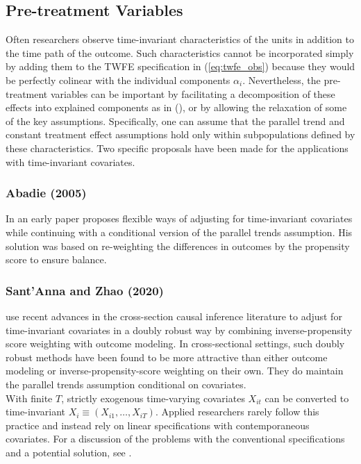 \documentclass[letterpaper,12pt,leqno]{article}
\begin{document}
\subsection{Pre-treatment Variables}

Often researchers observe time-invariant characteristics of the units in addition to the time path of the outcome. Such characteristics cannot be incorporated simply by adding them to the TWFE specification in (\ref{eq:twfe_obs}) because they would be perfectly colinear with the individual components $\alpha_i$. Nevertheless, the pre-treatment variables can be important by 
facilitating a decomposition of these effects into explained components as in 
 (\citep{plumper2007efficient}), or by allowing the relaxation of some of the key assumptions. Specifically, one can assume that the parallel trend and constant treatment effect assumptions hold only within subpopulations defined by these characteristics. Two specific proposals have been made for the applications with time-invariant covariates. 

\subsubsection{Abadie (2005)}

In an early paper \citep{abadie2005semiparametric} proposes flexible ways of adjusting for time-invariant covariates while continuing with a conditional version of the parallel trends assumption. His solution was based on re-weighting the differences in outcomes by the propensity score to ensure balance. 


\subsubsection{Sant’Anna and Zhao (2020)}

\citep{sant2020doubly} use recent advances in the cross-section causal inference literature to adjust for time-invariant covariates in a doubly robust way by combining inverse-propensity score weighting with outcome modeling. In cross-sectional settings, such doubly robust methods have been found to be more attractive than either outcome modeling or inverse-propensity-score weighting on their own. They do maintain the parallel trends assumption conditional on covariates.\\

With finite $T$, strictly exogenous time-varying covariates $X_{it}$ can be converted to time-invariant $X_{i} \equiv (X_{i1},\dots, X_{iT})$. Applied researchers rarely follow this practice and instead rely on linear specifications with contemporaneous covariates. For a discussion of the problems with the conventional specifications and a potential solution, see \citep{caetano2022difference}.
\end{document}
